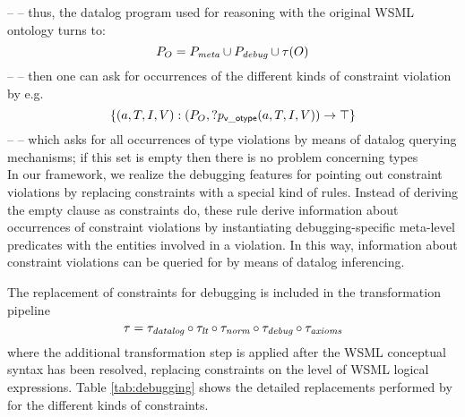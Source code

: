 -- -- thus, the datalog program used for reasoning with the original WSML ontology turns to: \\
\begin{displaymath}
    P_O = \mlaxioms \cup \debugaxioms \cup \tau(O)
\end{displaymath}
-- -- then one can ask for occurrences of the different kinds of constraint violation by e.g. \\
\begin{displaymath}
    \{(a,T,I,V) : (P_O , ?p_{\mathrm{\sf v\_otype}}(a,T,I,V)) \rightarrow \top \}
\end{displaymath}
-- -- which asks for all occurrences of type violations by means of datalog querying mechanisms; if this set is empty then there is no problem concerning types \\

In our framework, we realize the debugging features for pointing
out constraint violations by replacing constraints with a special
kind of rules. Instead of deriving the empty clause as constraints
do, these rule derive information about occurrences of constraint
violations by instantiating debugging-specific meta-level
predicates with the entities involved in a violation. In this way,
information about constraint violations can be queried for by
means of datalog inferencing.

The replacement of constraints for debugging is included in the
transformation pipeline
\begin{displaymath}
    \tau = \transdlog \circ \translt \circ \transnorm \circ \transdebug \circ \transax
\end{displaymath}
where the additional transformation step \transdebug is applied
after the WSML conceptual syntax has been resolved, replacing
constraints on the level of WSML logical expressions. Table
\ref{tab:debugging} shows the detailed replacements performed by
\transdebug for the different kinds of constraints.

